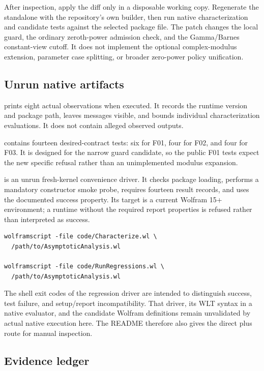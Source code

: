 \documentclass[11pt,letterpaper]{article}
\newcommand{\code}[1]{\texttt{\detokenize{#1}}}
\begin{document}
After inspection, apply the diff only in a disposable working copy. Regenerate the standalone with the repository's own builder, then run native characterization and candidate tests against the selected package file. The patch changes the local \code{Abs} guard, the ordinary zeroth-power admission check, and the Gamma/Barnes constant-view cutoff. It does not implement the optional complex-modulus extension, parameter case splitting, or broader zero-power policy unification.

\subsection{Unrun native artifacts}

 prints eight actual observations when executed. It records the runtime version and package path, leaves messages visible, and bounds individual characterization evaluations. It does not contain alleged observed outputs.

 contains fourteen desired-contract tests: six for F01, four for F02, and four for F03. It is designed for the narrow guard candidate, so the public F01 tests expect the new specific refusal rather than an unimplemented modulus expansion.

 is an unrun fresh-kernel convenience driver. It checks package loading, performs a mandatory constructor smoke probe, requires fourteen result records, and uses the documented \code{TestReportObject} success property. Its target is a current Wolfram 15+ environment; a runtime without the required report properties is refused rather than interpreted as success.\cite{testreportdoc}

\begin{lstlisting}
wolframscript -file code/Characterize.wl \
  /path/to/AsymptoticAnalysis.wl

wolframscript -file code/RunRegressions.wl \
  /path/to/AsymptoticAnalysis.wl
\end{lstlisting}

The shell exit codes of the regression driver are intended to distinguish success, test failure, and setup/report incompatibility. That driver, its WLT syntax in a native evaluator, and the candidate Wolfram definitions remain unvalidated by actual native execution here. The README therefore also gives the direct \code{Get} plus \code{TestReport} route for manual inspection.

\subsection{Evidence ledger}
\end{document}
